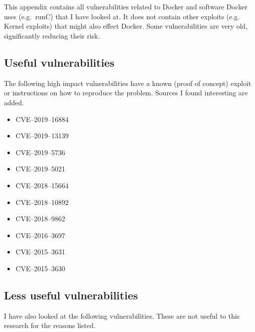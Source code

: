 \chapter{}\label{appendix:c}

This appendix contains all vulnerabilities related to Docker and software Docker uses (e.g.\ runC) that I have looked at. It does not contain other exploits (e.g. Kernel exploits) that might also effect Docker. Some vulnerabilities are very old, significantly reducing their risk.

\section{Useful vulnerabilities}
The following high impact vulnerabilities have a known (proof of concept) exploit or instructions on how to reproduce the problem. Sources I found interesting are added.
\begin{itemize}
    \item CVE--2019--16884\cite{CVE-2019-16884-Github}
    \item CVE--2019--13139\cite{CVE-2019-13139-STAALDRAAD}
    \item CVE--2019--5736\cite{CVE-2019-5736-DragonSector}\cite{CVE-2019-5736-Github}\cite{CVE-2019-5736-Twistlock}
    \item CVE--2019--5021\cite{CVE-2019-5021-Talos}\cite{CVE-2019-5021-Alpine}
    \item CVE--2018--15664\cite{CVE-2018-15664-Openwall}\cite{CVE-2018-15664-Bugzilla}
    \item CVE--2018--10892\cite{CVE-2018-10892-Github}
    \item CVE--2018--9862\cite{CVE-2018-9862-Github}
    \item CVE--2016--3697\cite{CVE-2016-3697-Github}
    \item CVE--2015--3631\cite{CVE-2015-363-Seclists}
    \item CVE--2015--3630\cite{CVE-2015-363-Seclists}
\end{itemize}

\section{Less useful vulnerabilities}
I have also looked at the following vulnerabilities. These are not useful to this research for the reasons listed.

\hfill

